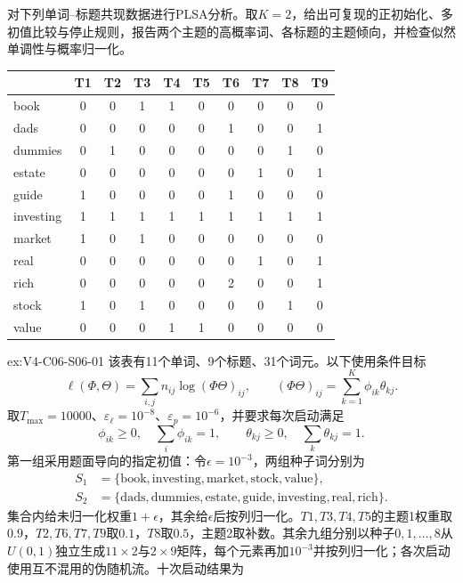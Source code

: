 \begin{SLChapterExercisePairSection}
\begin{exercise}\label{ex:V4-C06-S06-01}
对下列单词--标题共现数据进行PLSA分析。取$K=2$，给出可复现的正初始化、多初值比较与停止规则，报告两个主题的高概率词、各标题的主题倾向，并检查似然单调性与概率归一化。
\begin{center}
\footnotesize
\begin{tabular}{@{}lccccccccc@{}}
\toprule
 & T1 & T2 & T3 & T4 & T5 & T6 & T7 & T8 & T9\\ \midrule
book & 0&0&1&1&0&0&0&0&0\\
dads & 0&0&0&0&0&1&0&0&1\\
dummies & 0&1&0&0&0&0&0&1&0\\
estate & 0&0&0&0&0&0&1&0&1\\
guide & 1&0&0&0&0&1&0&0&0\\
investing & 1&1&1&1&1&1&1&1&1\\
market & 1&0&1&0&0&0&0&0&0\\
real & 0&0&0&0&0&0&1&0&1\\
rich & 0&0&0&0&0&2&0&0&1\\
stock & 1&0&1&0&0&0&0&1&0\\
value & 0&0&0&1&1&0&0&0&0\\
\bottomrule
\end{tabular}
\end{center}
\end{exercise}
\ifSLFullEdition
{}\label{sol:V4-C06-S06-01}
\begin{chapterexercisesolution}{ex:V4-C06-S06-01}
该表有11个单词、9个标题、31个词元。以下使用条件目标
\[
\ell(\Phi,\Theta)
=\sum_{i,j}n_{ij}\log(\Phi\Theta)_{ij},
\qquad
(\Phi\Theta)_{ij}=\sum_{k=1}^{K}\phi_{ik}\theta_{kj}.
\]
取$T_{\max}=10000$、$\varepsilon_\ell=10^{-8}$、$\varepsilon_p=10^{-6}$，并要求每次启动满足
\[
\phi_{ik}\ge0,
\quad \sum_i\phi_{ik}=1,
\qquad
\theta_{kj}\ge0,
\quad \sum_k\theta_{kj}=1.
\]
第一组采用题面导向的指定初值：令$\epsilon=10^{-3}$，两组种子词分别为
\[
\begin{aligned}
S_1&=\{\text{book},\text{investing},\text{market},\text{stock},\text{value}\},\\
S_2&=\{\text{dads},\text{dummies},\text{estate},\text{guide},\text{investing},\text{real},\text{rich}\}.
\end{aligned}
\]
集合内给未归一化权重$1+\epsilon$，其余给$\epsilon$后按列归一化。$T1,T3,T4,T5$的主题1权重取$0.9$，$T2,T6,T7,T9$取$0.1$，$T8$取$0.5$，主题2取补数。其余九组分别以种子$0,1,\ldots,8$从$U(0,1)$独立生成$11\times2$与$2\times9$矩阵，每个元素再加$10^{-3}$并按列归一化；各次启动使用互不混用的伪随机流。十次启动结果为


\end{chapterexercisesolution}
\end{SLChapterExercisePairSection}

